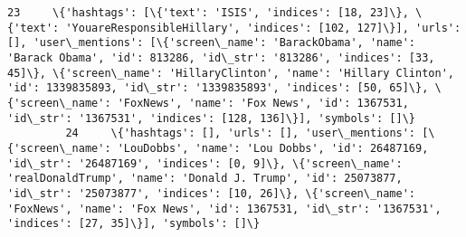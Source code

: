 \documentclass[11pt]{article}
\begin{document}
\begin{Verbatim}[commandchars=\\\{\}]
         23     \{'hashtags': [\{'text': 'ISIS', 'indices': [18, 23]\}, \{'text': 'YouareResponsibleHillary', 'indices': [102, 127]\}], 'urls': [], 'user\_mentions': [\{'screen\_name': 'BarackObama', 'name': 'Barack Obama', 'id': 813286, 'id\_str': '813286', 'indices': [33, 45]\}, \{'screen\_name': 'HillaryClinton', 'name': 'Hillary Clinton', 'id': 1339835893, 'id\_str': '1339835893', 'indices': [50, 65]\}, \{'screen\_name': 'FoxNews', 'name': 'Fox News', 'id': 1367531, 'id\_str': '1367531', 'indices': [128, 136]\}], 'symbols': []\}                                                                                                                                                                                                                                                                                                                                                                                                                                                                                                                                                                                                                                                                                        
         24     \{'hashtags': [], 'urls': [], 'user\_mentions': [\{'screen\_name': 'LouDobbs', 'name': 'Lou Dobbs', 'id': 26487169, 'id\_str': '26487169', 'indices': [0, 9]\}, \{'screen\_name': 'realDonaldTrump', 'name': 'Donald J. Trump', 'id': 25073877, 'id\_str': '25073877', 'indices': [10, 26]\}, \{'screen\_name': 'FoxNews', 'name': 'Fox News', 'id': 1367531, 'id\_str': '1367531', 'indices': [27, 35]\}], 'symbols': []\}                                                                                                                                                                                                                                                                                                                                                                                                                                                                                                                                                                                                                                                                                                                                                                                                   

\end{Verbatim}
\end{document}
